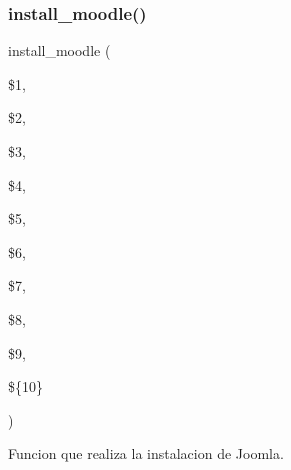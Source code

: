 \subsubsection{\texorpdfstring{install\+\_\+moodle()}{install\_moodle()}}
{\footnotesize\ttfamily install\+\_\+moodle (\begin{DoxyParamCaption}\item[{}]{\$1,  }\item[{}]{\$2,  }\item[{}]{\$3,  }\item[{}]{\$4,  }\item[{}]{\$5,  }\item[{}]{\$6,  }\item[{}]{\$7,  }\item[{}]{\$8,  }\item[{}]{\$9,  }\item[{}]{\$\{10\} }\end{DoxyParamCaption})}



Funcion que realiza la instalacion de Joomla. 


